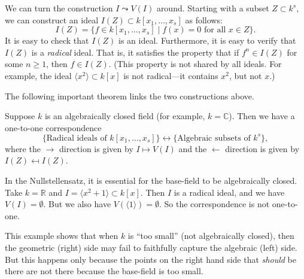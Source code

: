 \documentclass[11pt]{article}
\newcommand{\C}{\mathbb C}
\newcommand{\R}{\mathbb R}
\begin{document}
We can turn the construction $I \leadsto V(I)$ around.
Starting with a subset $Z \subset k^s$, we can construct an ideal $I(Z) \subset k[x_1, \dots, x_s]$ as follows:
\[ I(Z) = \{f \in k[x_1,\dots,x_s] \mid f(x) = 0 \text{ for all $x \in Z$}\}.\]
It is easy to check that $I(Z)$ is an ideal.
Furthermore, it is easy to verify that $I(Z)$ is a \emph{radical} ideal.
That is, it satisfies the property that if $f^n \in I(Z)$ for some $n \geq 1$, then $f \in I(Z)$.
(This property is not shared by all ideals.
For example, the ideal $\langle  x^2 \rangle \subset k[x]$ is not radical---it contains $x^2$, but not $x$.)

The following important theorem links the two constructions above.
\begin{theorem}[Nullstellensatz]
  Suppose $k$ is an algebraically closed field (for example, $k = \C$).
  Then we have a one-to-one correspondence
  \[
    \{\text{Radical ideals of $k[x_1,\dots,x_s]$}\}
    \leftrightarrow
    \{\text{Algebraic subsets of $k^s$}\},
  \]
  where the $\rightarrow$  direction is given by $I \mapsto V(I)$ and the $\leftarrow$ direction is given by $I(Z) \mapsfrom I(Z)$.
\end{theorem}

\begin{example}
  In the Nullstellensatz, it is essential for the base-field to be algebraically closed.
  Take $k = \R$ and $I = \langle  x^2 + 1 \rangle \subset k[x]$.
  Then $I$ is a radical ideal, and we have $V(I) = \emptyset$.
  But we also have $V(\langle  1 \rangle) = \emptyset$.
  So the correspondence is not one-to-one.

  This example shows that when $k$ is ``too small'' (not algebraically closed), then the geometric (right) side may fail to faithfully capture the algebraic (left) side.
  But this happens only because the points on the right hand side that \emph{should} be there are not there because the base-field is too small.
\end{example}
\end{document}
